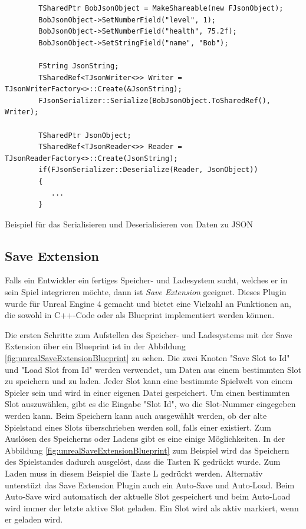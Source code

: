 \begin{listing}[htp]
    \begin{verbatim}
        TSharedPtr BobJsonObject = MakeShareable(new FJsonObject);
        BobJsonObject->SetNumberField("level", 1);
        BobJsonObject->SetNumberField("health", 75.2f);
        BobJsonObject->SetStringField("name", "Bob");
        
        FString JsonString;
        TSharedRef<TJsonWriter<>> Writer = TJsonWriterFactory<>::Create(&JsonString);
        FJsonSerializer::Serialize(BobJsonObject.ToSharedRef(), Writer);   
        
        TSharedPtr JsonObject;
        TSharedRef<TJsonReader<>> Reader = TJsonReaderFactory<>::Create(JsonString);
        if(FJsonSerializer::Deserialize(Reader, JsonObject)) 
        {
           ...
        }
    \end{verbatim}
    \caption{Beispiel für das Serialisieren und Deserialisieren von Daten zu JSON}
    \label{lst:unrealFJsonSerializer}
\end{listing}

\subsection{Save Extension}
Falls ein Entwickler ein fertiges Speicher- und Ladesystem sucht, welches er in sein Spiel integrieren möchte, dann ist \textit{Save Extension} geeignet. Dieses Plugin wurde für Unreal Engine 4 gemacht und bietet eine Vielzahl an Funktionen an, die sowohl in C++-Code oder als Blueprint implementiert werden können.\cite{unrealengineSaveExtension}

Die ersten Schritte zum Aufstellen des Speicher- und Ladesystems mit der Save Extension über ein Blueprint ist in der Abbildung \ref{fig:unrealSaveExtensionBlueprint} zu sehen. Die zwei Knoten "Save Slot to Id" und "Load Slot from Id" werden verwendet, um Daten aus einem bestimmten Slot zu speichern und zu laden. Jeder Slot kann eine bestimmte Spielwelt von einem Spieler sein und wird in einer eigenen Datei gespeichert.\cite{piperiftPiperiftSaveSlot} Um einen bestimmten Slot auszuwählen, gibt es die Eingabe "Slot Id", wo die Slot-Nummer eingegeben werden kann. Beim Speichern kann auch ausgewählt werden, ob der alte Spielstand eines Slots überschrieben werden soll, falls einer existiert. Zum Auslösen des Speicherns oder Ladens gibt es eine einige Möglichkeiten. In der Abbildung \ref{fig:unrealSaveExtensionBlueprint} zum Beispiel wird das Speichern des Spielstandes dadurch ausgelöst, dass die Tasten K gedrückt wurde. Zum Laden muss in diesem Beispiel die Taste L gedrückt werden. Alternativ unterstüzt das Save Extension Plugin auch ein Auto-Save und Auto-Load. Beim Auto-Save wird automatisch der aktuelle Slot gespeichert und beim Auto-Load wird immer der letzte aktive Slot geladen. Ein Slot wird als aktiv markiert, wenn er geladen wird.\cite{piperiftPiperiftSaveSlot}\cite{piperiftPiperiftSaveBlueprint} 

